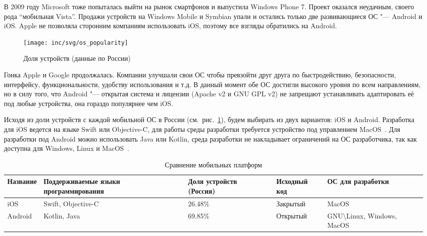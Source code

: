 В 2009 году Microsoft тоже попыталась выйти на рынок смартфонов и выпустила Windows Phone 7.
Проект оказался неудачным, своего рода ``мобильная Vista''.
Продажи устройств на Windows Mobile и Symbian упали и остались только две развивающиеся ОС "--- Android и iOS\@.
Apple не позволяла сторонним компаниям использовать iOS, поэтому все взгляды обратились  на Android.

\begin{figure}[ht]
  \centering
  \texttt{[image: inc/svg/os\_popularity]}
  \caption{Доля устройств (данные по России)}
  \label{fig:osPopularity}
\end{figure}

Гонка Apple и Google продолжалась.
Компании улучшали свои ОС чтобы превзойти друг друга по быстродействию, безопасности, интерфейсу, функциональности, удобству использования и т.д\@.
В данный момент обе ОС достигли высокого уровня по всем направлениям, но в силу того, что Android "--- открытая система и лицензии (Apache v2 и GNU GPL v2) не запрещают устанавливать адаптировать её под любые устройства, она гораздо популярнее чем iOS\@.

Исходя из доли устройств с каждой мобильной ОС в России (см.~рис.~\ref{fig:osPopularity}), будем выбирать из двух вариантов: iOS и Android.
Разработка для iOS ведется на языке Swift или Objective-C, для работы среды разработки требуется устройство под управлением MacOS~\cite{appleDev}.
Для разработки под Android можно использовать Java или Kotlin, среда разработки не накладывает ограничений на ОС разработчика, так как доступна для Windows, Linux и MacOS~\cite{androidDev}.

\begin{table}[ht]
  \caption{Сравнение мобильных платформ}
  \label{tab:os}
  \begin{tabular*}{\textwidth}{|L|M{0.29\textwidth}|M{0.19\textwidth}|M{0.12\textwidth}|M{0.138\textwidth}|}
    \hline
    Название & Поддерживаемые языки программирования & Доля устройств (Россия)~\cite{statista:os} & Исходный код & ОС для разработки \\
    \hline
    iOS~\cite{appleDev}       & Swift, Objective-C & 26.48\% & Закрытый & MacOS \\
    \hline
    Android~\cite{androidDev} & Kotlin, Java       & 69.85\% & Открытый & GNU\textbackslash Linux, Windows, MacOS \\
    \hline
  \end{tabular*}
\end{table}

